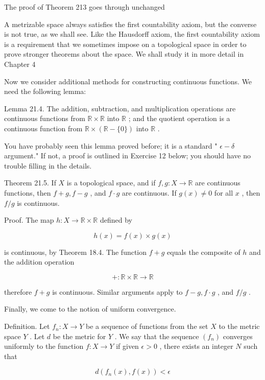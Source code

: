 The proof of Theorem 213 goes through unchanged

A metrizable space always satisfies the first countability axiom, but the converse is not true, as we shall see. Like the Hausdorff axiom, the first countability axiom is a requirement that we sometimes impose on a topological space in order to prove stronger theorems about the space. We shall study it in more detail in Chapter 4

Now we consider additional methods for constructing continuous functions. We need the following lemma:

Lemma 21.4. The addition, subtraction, and multiplication operations are continuous functions from \(\mathbb{R} \times  \mathbb{R}\) into \(\mathbb{R}\) ; and the quotient operation is a continuous function from \(\mathbb{R} \times  \left( {\mathbb{R}-\{ 0\} }\right)\) into \(\mathbb{R}\) .

You have probably seen this lemma proved before; it is a standard " \(\epsilon  - \delta\) argument." If not, a proof is outlined in Exercise 12 below; you should have no trouble filling in the details.

Theorem 21.5. If \(X\) is a topological space, and if \(f,g : X \rightarrow  \mathbb{R}\) are continuous functions, then \(f + g,f - g\) , and \(f \cdot  g\) are continuous. If \(g\left( x\right)  \neq  0\) for all \(x\) , then \(f/g\) is continuous.

Proof. The map \(h : X \rightarrow  \mathbb{R} \times  \mathbb{R}\) defined by

\[
h\left( x\right)  = f\left( x\right)  \times  g\left( x\right)
\]

is continuous, by Theorem 18.4. The function \(f + g\) equals the composite of \(h\) and the addition operation

\[
+  : \mathbb{R} \times  \mathbb{R} \rightarrow  \mathbb{R}
\]

therefore \(f + g\) is continuous. Similar arguments apply to \(f - g,f \cdot  g\) , and \(f/g\) .

Finally, we come to the notion of uniform convergence.

Definition. Let \({f}_{n} : X \rightarrow  Y\) be a sequence of functions from the set \(X\) to the metric space \(Y\) . Let \(d\) be the metric for \(Y\) . We say that the sequence \(\left( {f}_{n}\right)\) converges uniformly to the function \(f : X \rightarrow  Y\) if given \(\epsilon  > 0\) , there exists an integer \(N\) such that

\[
d\left( {{f}_{n}\left( x\right) ,f\left( x\right) }\right)  < \epsilon
\]

